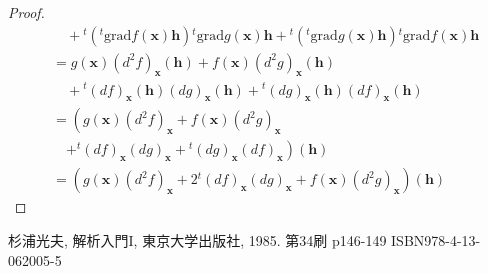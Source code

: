 \documentclass[dvipdfmx]{jsarticle}
\begin{document}
\begin{proof}
\begin{align*}
&\quad +{}^{t}\left({}^{t}\mathrm{grad}f\left( \mathbf{x} \right)\mathbf{h} \right){}^{t}\mathrm{grad}g\left( \mathbf{x} \right)\mathbf{h} +{}^{t}\left({}^{t}\mathrm{grad}g\left( \mathbf{x} \right)\mathbf{h} \right){}^{t}\mathrm{grad}f\left( \mathbf{x} \right)\mathbf{h}\\
&= g\left( \mathbf{x} \right)\left( d^{2}f \right)_{\mathbf{x}}\left( \mathbf{h} \right) + f\left( \mathbf{x} \right)\left( d^{2}g \right)_{\mathbf{x}}\left( \mathbf{h} \right) \\
&\quad +{}^{t}(df)_{\mathbf{x}}\left( \mathbf{h} \right)(dg)_{\mathbf{x}}\left( \mathbf{h} \right) +{}^{t}(dg)_{\mathbf{x}}\left( \mathbf{h} \right)(df)_{\mathbf{x}}\left( \mathbf{h} \right)\\
&= \left( g\left( \mathbf{x} \right)\left( d^{2}f \right)_{\mathbf{x}} + f\left( \mathbf{x} \right)\left( d^{2}g \right)_{\mathbf{x}} \right. \\
&\quad \left. +{}^{t}(df)_{\mathbf{x}}(dg)_{\mathbf{x}} +{}^{t}(dg)_{\mathbf{x}}(df)_{\mathbf{x}} \right)\left( \mathbf{h} \right)\\
&= \left( g\left( \mathbf{x} \right)\left( d^{2}f \right)_{\mathbf{x}} + 2{}^{t}(df)_{\mathbf{x}}(dg)_{\mathbf{x}} + f\left( \mathbf{x} \right)\left( d^{2}g \right)_{\mathbf{x}} \right)\left( \mathbf{h} \right)
\end{align*}
\end{proof}
\begin{thebibliography}{50}
  杉浦光夫, 解析入門I, 東京大学出版社, 1985. 第34刷 p146-149 ISBN978-4-13-062005-5
\end{thebibliography}
\end{document}
